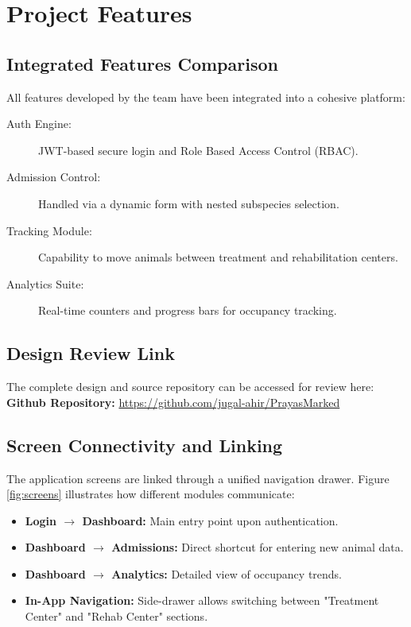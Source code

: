 \documentclass[12pt,a4paper]{report}
\begin{document}
\chapter{Project Features}
\section{Integrated Features Comparison}
All features developed by the team have been integrated into a cohesive platform:
\begin{description}
    \item[Auth Engine:] JWT-based secure login and Role Based Access Control (RBAC).
    \item[Admission Control:] Handled via a dynamic form with nested subspecies selection.
    \item[Tracking Module:] Capability to move animals between treatment and rehabilitation centers.
    \item[Analytics Suite:] Real-time counters and progress bars for occupancy tracking.
\end{description}

\section{Design Review Link}
The complete design and source repository can be accessed for review here: \\
\vspace{0.2cm}
\textbf{Github Repository:} \href{https://github.com/jugal-ahir/PrayasMarked}{https://github.com/jugal-ahir/PrayasMarked}

\section{Screen Connectivity and Linking}
The application screens are linked through a unified navigation drawer. Figure \ref{fig:screens} illustrates how different modules communicate:
\begin{itemize}
    \item \textbf{Login $\rightarrow$ Dashboard:} Main entry point upon authentication.
    \item \textbf{Dashboard $\rightarrow$ Admissions:} Direct shortcut for entering new animal data.
    \item \textbf{Dashboard $\rightarrow$ Analytics:} Detailed view of occupancy trends.
    \item \textbf{In-App Navigation:} Side-drawer allows switching between "Treatment Center" and "Rehab Center" sections.
\end{itemize}
\end{document}
